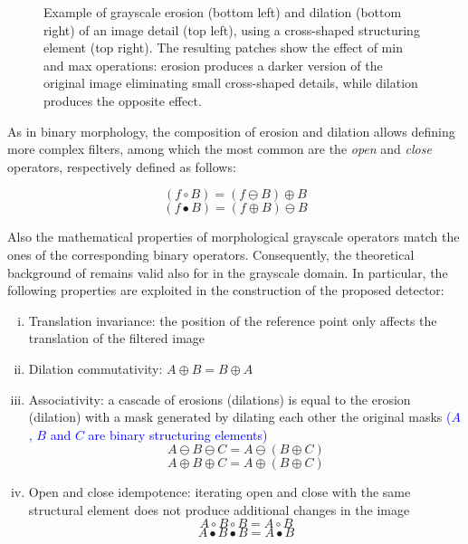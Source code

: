 \documentclass{ieeeaccess}
\begin{document}
\begin{figure}[t!]
\begin{tabular}{cc}
	\end{tabular}
	\caption{Example of grayscale erosion (bottom left) and dilation (bottom right) of an image detail (top left), using a cross-shaped structuring element (top right). The resulting patches show the effect of min and max operations: erosion produces a darker version of the original image eliminating small cross-shaped details, while dilation produces the opposite effect.}
	\label{fig:grayscale_ex}
\end{figure}

As in binary morphology, the composition of erosion and dilation allows defining more complex filters, among which the most common are the \textit{open} and \textit{close} operators, respectively defined as follows:

\begin{equation}
(f \circ B) = (f \ominus B) \oplus B
\end{equation}
\vspace{-0.5cm}
\begin{equation}
(f \bullet B) = (f \oplus B) \ominus B
\end{equation}

Also the mathematical properties of morphological grayscale operators match the ones of the corresponding binary operators. Consequently, the theoretical background of \cite{de2017detecting} remains valid also for in the grayscale domain. In particular, the following properties are exploited in the construction of the proposed detector:

\begin{enumerate}[(i)]
	\item Translation invariance: the position of the reference point only affects the translation of the filtered image
	\item Dilation commutativity: $A\oplus B = B \oplus A$
	\item Associativity: a cascade of erosions (dilations) is equal to the erosion (dilation) with a mask generated by dilating each other the original masks \textcolor{blue}{($A$, $B$ and $C$ are binary structuring elements)}
	\begin{equation}
	A \ominus B \ominus C = A \ominus (B \oplus C)
	\end{equation}
	\vspace{-0.5cm}
	\begin{equation}
	A \oplus B \oplus C = A \oplus (B \oplus C)
	\end{equation} 
	\item Open and close idempotence: iterating open and close with the same structural element does not produce additional changes in the image
	\begin{equation}
	A \circ B \circ B = A \circ B
	\end{equation}
	\vspace{-0.5cm}
	\begin{equation}
	A \bullet B \bullet B = A \bullet B
	\end{equation} 
\end{enumerate}
\end{document}
